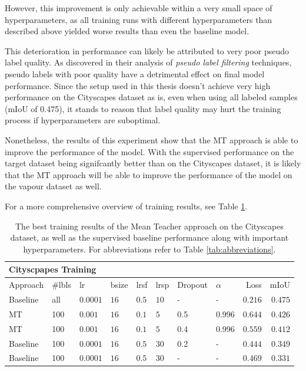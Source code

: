 However, this improvement is only achievable within a very small space of hyperparameters, as all training runs with different hyperparameters than described above yielded worse results than even the baseline model.

This deterioration in performance can likely be attributed to very poor pseudo label quality. As \citeauthor{schererPseudoLabelNoiseSuppression2022}\cite{schererPseudoLabelNoiseSuppression2022} discovered in their analysis of \emph{pseudo label filtering} techniques, pseudo labels with poor quality have a detrimental effect on final model performance.
Since the setup used in this thesis doesn't achieve very high performance on the Cityscapes dataset as is, even when using all labeled samples (mIoU of \num{0.475}), it stands to reason that label quality may hurt the training process if hyperparameters are suboptimal.

Nonetheless, the results of this experiment show that the MT approach is able to improve the performance of the model. With the supervised performance on the target dataset being signifcantly better than on the Cityscapes dataset, it is likely that the MT approach will be able to improve the performance of the model on the vapour dataset as well.

For a more comprehensive overview of training results, see Table \ref{tab:cityscapes_results_mt}.

\begin{table}[htbp]
    \centering
    \begin{tabular}{llllllllrr}
        \toprule
        \multicolumn{9}{l}{Cityscpapes Training}\\  
        \midrule
        Approach & \#lbls & lr & bsize & lrsf & lrsp & Dropout & $\alpha$ & Loss &
        mIoU \\
        \midrule 
        Baseline & all & $0.0001$ & $16$ & $0.5$ & $10$ & - & - & $0.216$ & $0.475$ \\
        MT & 100 & $0.001$ & $16$ & $0.1$ & $5$ & \num{0.5} & \num{0.996} & $0.644$ & $\mathbf{0.426}$ \\
        MT & 100 & $0.001$ & $16$ & $0.1$ & $5$ & \num{0.4} & \num{0.996} & $0.559$ & $0.412$ \\
        Baseline & 100 & $0.0001$ & $16$ & $0.5$ & $30$ & \num{0.2} & - & $0.444$ & $0.349$ \\
        Baseline & 100 & $0.0001$ & $16$ & $0.5$ & $30$ & - & - & $0.469$ & $0.331$ \\
        \bottomrule
    \end{tabular}
    \vspace{0.1cm}
    \caption{The best training results of the Mean Teacher approach on the Cityscapes dataset, as well as the supervised baseline performance along with important hyperparameters. For abbreviations refer to Table \ref{tab:abbreviations}.}
    \label{tab:cityscapes_results_mt}
\end{table}

